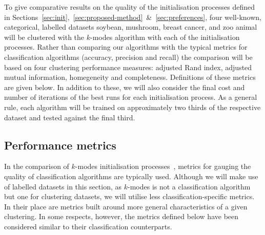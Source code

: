 To give comparative results on the quality of the initialisation processes 
defined in
Sections~\ref{sec:init},~\ref{sec:proposed-method}~\&~\ref{sec:preferences},
four well-known, categorical, labelled datasets \- soybean, mushroom, breast
cancer, and zoo animal \- will be clustered with the \(k\)-modes algorithm with
each of the initialisation processes. Rather than comparing our algorithms with
the typical metrics for classification algorithms (accuracy, precision and
recall) the comparison will be based on four clustering performance measures:
adjusted Rand index, adjusted mutual information, homegeneity and completeness.
Definitions of these metrics are given below. In addition to these, we will also
consider the final cost and number of iterations of the best runs for each
initialisation process. As a general rule, each algorithm will be trained on
approximately two thirds of the respective dataset and tested against the final
third.

\subsection{Performance metrics}\label{subsec:metrics}

In the comparison of \(k\)-modes initialisation
processes~\cite{Huang98}\cite{Cao09}, metrics for gauging the quality of
classification algorithms are typically used. Although we will make use of
labelled datasets in this section, as \(k\)-modes is not a classification
algorithm but one for clustering datasets, we will utilise less
classification-specific metrics. In their place are metrics built around more
general characteristics of a given clustering. In some respects, however, the
metrics defined below have been considered similar to their classification
counterparts.\\

